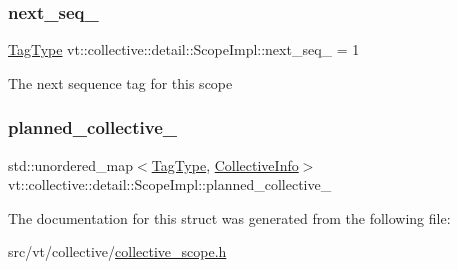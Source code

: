 \subsubsection{\texorpdfstring{next\+\_\+seq\+\_\+}{next\_seq\_}}
{\footnotesize\ttfamily \hyperlink{namespacevt_a84ab281dae04a52a4b243d6bf62d0e52}{Tag\+Type} vt\+::collective\+::detail\+::\+Scope\+Impl\+::next\+\_\+seq\+\_\+ = 1\hspace{0.3cm}{\ttfamily [private]}}

The next sequence tag for this scope \mbox{\label{structvt_1_1collective_1_1detail_1_1_scope_impl_a6eaa0beff1bd71895daec9f7ca6152c8}} 
\subsubsection{\texorpdfstring{planned\+\_\+collective\+\_\+}{planned\_collective\_}}
{\footnotesize\ttfamily std\+::unordered\+\_\+map$<$\hyperlink{namespacevt_a84ab281dae04a52a4b243d6bf62d0e52}{Tag\+Type}, \hyperlink{structvt_1_1collective_1_1detail_1_1_scope_impl_1_1_collective_info}{Collective\+Info}$>$ vt\+::collective\+::detail\+::\+Scope\+Impl\+::planned\+\_\+collective\+\_\+\hspace{0.3cm}{\ttfamily [private]}}



The documentation for this struct was generated from the following file\+:\begin{DoxyCompactItemize}
\item 
src/vt/collective/\hyperlink{collective__scope_8h}{collective\+\_\+scope.\+h}\end{DoxyCompactItemize}
